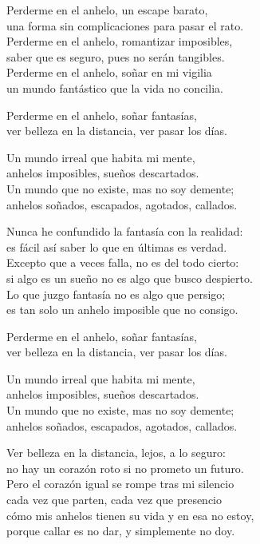 \begin{lyrics}
Perderme en el anhelo, un escape barato,\\
una forma sin complicaciones para pasar el rato.\\
Perderme en el anhelo, romantizar imposibles,\\
saber que es seguro, pues no serán tangibles.\\
Perderme en el anhelo, soñar en mi vigilia\\
un mundo fantástico que la vida no concilia.

Perderme en el anhelo, soñar fantasías,\\
ver belleza en la distancia, ver pasar los días.

Un mundo irreal que habita mi mente,\\
anhelos imposibles, sueños descartados.\\
Un mundo que no existe, mas no soy demente;\\
anhelos soñados, escapados, agotados, callados.

Nunca he confundido la fantasía con la realidad:\\
es fácil así saber lo que en últimas es verdad.\\
Excepto que a veces falla, no es del todo cierto:\\
si algo es un sueño no es algo que busco despierto.\\
Lo que juzgo fantasía no es algo que persigo;\\
es tan solo un anhelo imposible que no consigo.

Perderme en el anhelo, soñar fantasías,\\
ver belleza en la distancia, ver pasar los días.

Un mundo irreal que habita mi mente,\\
anhelos imposibles, sueños descartados.\\
Un mundo que no existe, mas no soy demente;\\
anhelos soñados, escapados, agotados, callados.

Ver belleza en la distancia, lejos, a lo seguro:\\
no hay un corazón roto si no prometo un futuro.\\
Pero el corazón igual se rompe tras mi silencio\\
cada vez que parten, cada vez que presencio\\
cómo mis anhelos tienen su vida y en esa no estoy,\\
porque callar es no dar, y simplemente no doy.


\end{lyrics}
